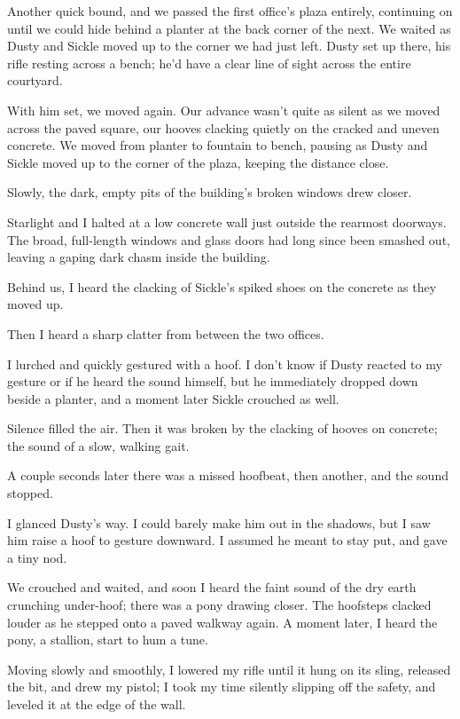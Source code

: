 Another quick bound, and we passed the first office’s plaza entirely, continuing on until we could hide behind a planter at the back corner of the next. We waited as Dusty and Sickle moved up to the corner we had just left. Dusty set up there, his rifle resting across a bench; he’d have a clear line of sight across the entire courtyard.

With him set, we moved again. Our advance wasn’t quite as silent as we moved across the paved square, our hooves clacking quietly on the cracked and uneven concrete. We moved from planter to fountain to bench, pausing as Dusty and Sickle moved up to the corner of the plaza, keeping the distance close.

Slowly, the dark, empty pits of the building’s broken windows drew closer.

Starlight and I halted at a low concrete wall just outside the rearmost doorways. The broad, full-length windows and glass doors had long since been smashed out, leaving a gaping dark chasm inside the building.

Behind us, I heard the clacking of Sickle’s spiked shoes on the concrete as they moved up.

Then I heard a sharp clatter from between the two offices.

I lurched and quickly gestured with a hoof. I don’t know if Dusty reacted to my gesture or if he heard the sound himself, but he immediately dropped down beside a planter, and a moment later Sickle crouched as well.

Silence filled the air. Then it was broken by the clacking of hooves on concrete; the sound of a slow, walking gait.

A couple seconds later there was a missed hoofbeat, then another, and the sound stopped.

I glanced Dusty’s way. I could barely make him out in the shadows, but I saw him raise a hoof to gesture downward. I assumed he meant to stay put, and gave a tiny nod.

We crouched and waited, and soon I heard the faint sound of the dry earth crunching under-hoof; there was a pony drawing closer. The hoofsteps clacked louder as he stepped onto a paved walkway again. A moment later, I heard the pony, a stallion, start to hum a tune.

Moving slowly and smoothly, I lowered my rifle until it hung on its sling, released the bit, and drew my pistol; I took my time silently slipping off the safety, and leveled it at the edge of the wall.

